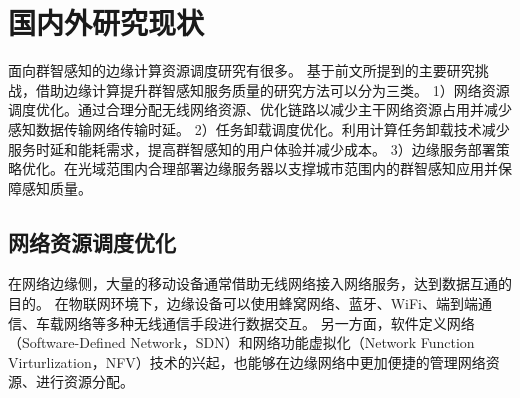 








\section{国内外研究现状}

面向群智感知的边缘计算资源调度研究有很多。
基于前文所提到的主要研究挑战，借助边缘计算提升群智感知服务质量的研究方法可以分为三类。
1）网络资源调度优化。通过合理分配无线网络资源、优化链路以减少主干网络资源占用并减少感知数据传输网络传输时延。
2）任务卸载调度优化。利用计算任务卸载技术减少服务时延和能耗需求，提高群智感知的用户体验并减少成本。
3）边缘服务部署策略优化。在光域范围内合理部署边缘服务器以支撑城市范围内的群智感知应用并保障感知质量。

\subsection{网络资源调度优化}

在网络边缘侧，大量的移动设备通常借助无线网络接入网络服务，达到数据互通的目的。
在物联网环境下，边缘设备可以使用蜂窝网络、蓝牙、WiFi、端到端通信、车载网络等多种无线通信手段进行数据交互。
另一方面，软件定义网络（Software-Defined Network，SDN）和网络功能虚拟化（Network Function Virturlization，NFV）技术的兴起，也能够在边缘网络中更加便捷的管理网络资源、进行资源分配。

